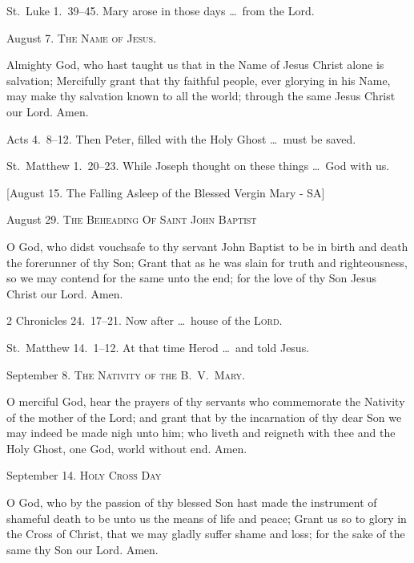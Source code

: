 St.~Luke 1.~39–45.   Mary arose in those days \ldots\ from the Lord.

\medskip

\noindent August 7. {\scshape The Name of Jesus.}

 Almighty God, who hast taught us that in the Name of Jesus Christ alone is salvation; Mercifully grant that thy faithful people, ever glorying in his Name, may make thy salvation known to all the world; through the same Jesus Christ our Lord. \R Amen.

 Acts 4.~8–12.   Then Peter, filled with the Holy Ghost \ldots\ must be saved.

 St.~Matthew 1.~20–23.   While Joseph thought on these things \ldots\ God with us.

\medskip

[August 15. The Falling Asleep of the Blessed Vergin Mary - SA]

\medskip

\noindent August 29. {\scshape The Beheading Of Saint John Baptist}

 O God, who didst vouchsafe to thy servant John Baptist to be in birth and death the forerunner of thy Son; Grant that as he was slain for truth and righteousness, so we may contend for the same unto the end; for the love of thy Son Jesus Christ our Lord. \R Amen.

 2 Chronicles 24.~17–21.   Now after \ldots\ house of the {\scshape Lord}.

 St.~Matthew 14.~1–12.   At that time Herod \ldots\ and told Jesus.

\medskip

\noindent September 8. {\scshape The Nativity of the B.~V.~Mary.}

 O merciful God, hear the prayers of thy servants who commemorate the Nativity of the mother of the Lord; and grant that by the incarnation of thy dear Son we may indeed be made nigh unto him; who liveth and reigneth with thee and the Holy Ghost, one God, world without end. \R Amen.

\medskip

\noindent September 14. {\scshape Holy Cross Day}

 O God, who by the passion of thy blessed Son hast made the instrument of shameful death to be unto us the means of life and peace; Grant us so to glory in the Cross of Christ, that we may gladly suffer shame and loss; for the sake of the same thy Son our Lord. \R Amen.

